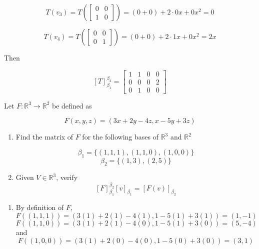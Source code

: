 \documentclass{report}
\begin{document}
\begin{Example}
        $$T(v_3) = T \left(\begin{bmatrix}
            0 & 0 \\
            1 & 0
        \end{bmatrix}\right) = (0 + 0) + 2 \cdot 0x + 0x^2 = 0$$

        $$T(v_4) = T \left(\begin{bmatrix}
            0 & 0 \\
            0 & 1
        \end{bmatrix}\right) = (0 + 0) + 2 \cdot 1x + 0x^2 = 2x$$

        Then

        $$[T]_{\beta_1}^{\beta_2} = \begin{bmatrix}
            1 & 1 & 0 & 0 \\
            0 & 0 & 0 & 2 \\
            0 & 1 & 0 & 0
        \end{bmatrix}$$

        Let $F: \mathbb{R}^3 \to \mathbb{R}^2$ be defined as

        $$F(x, y, z) = (3x + 2y - 4z, x - 5y + 3z)$$

        \begin{enumerate}
            \item Find the matrix of $F$ for the following bases of $\mathbb{R}^3$ and $\mathbb{R}^2$

            $$\beta_1 = \{(1,1,1), (1,1,0), (1,0,0)\}$$
            $$\beta_2 = \{(1,3), (2,5)\}$$

            \item Given $V \in \mathbb{R}^3$, verify
            $$[F]_{\beta_1}^{\beta_2}[v]_{\beta_1} = [F(v)]_{\beta_2}$$
        \end{enumerate}

        \begin{enumerate}
            \item By definition of $F$,
            $$F((1,1,1)) = (3(1) + 2(1) - 4(1), 1 - 5(1) + 3(1)) = (1, -1)$$
            $$F((1,1,0)) = (3(1) + 2(1) - 4(0), 1 - 5(1) + 3(0)) = (5, -4)$$
            and
            $$F((1,0,0)) = (3(1) + 2(0) - 4(0), 1 - 5(0) + 3(0)) = (3, 1)$$


\end{enumerate}
\end{Example}
\end{document}
